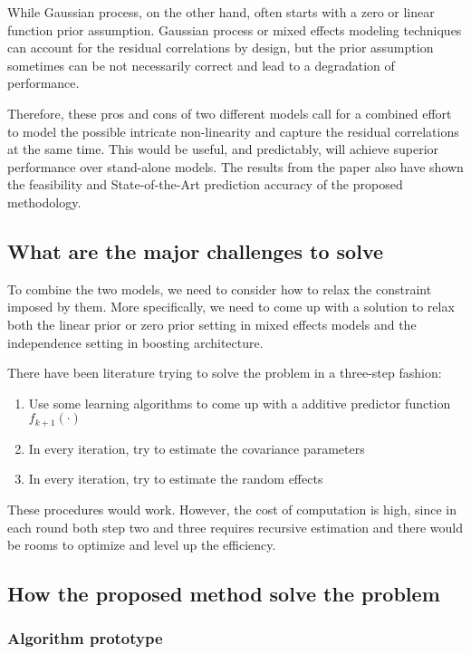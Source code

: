 \documentclass[12pt,a4paper]{article}
\begin{document}
While Gaussian process, on the other hand, often starts with a zero or linear function prior assumption. Gaussian process or mixed effects modeling techniques can account for the residual correlations by design, but the prior assumption sometimes can be not necessarily correct and lead to a degradation of performance.

Therefore, these pros and cons of two different models call for a combined effort to model the possible intricate non-linearity and capture the residual correlations at the same time. This would be useful, and predictably, will achieve superior performance over stand-alone models. The results from the paper also have shown the feasibility and State-of-the-Art prediction accuracy of the proposed methodology.


\subsection{What are the major challenges to solve}

To combine the two models, we need to consider how to relax the constraint imposed by them. More specifically, we need to come up with a solution to relax both the linear prior or zero prior setting in mixed effects models and the independence setting in boosting architecture.

There have been literature trying to solve the problem in a three-step fashion:

\begin{enumerate}
  \item Use some learning algorithms to come up with a additive predictor function $f_{k+1}(\cdot)$
  \item In every iteration, try to estimate the covariance parameters
  \item In every iteration, try to estimate the random effects
\end{enumerate}

These procedures would work. However, the cost of computation is high, since in each round both step two and three requires recursive estimation and there would be rooms to optimize and level up the efficiency.


\subsection{How the proposed method solve the problem}

\subsubsection{Algorithm prototype}
\end{document}

